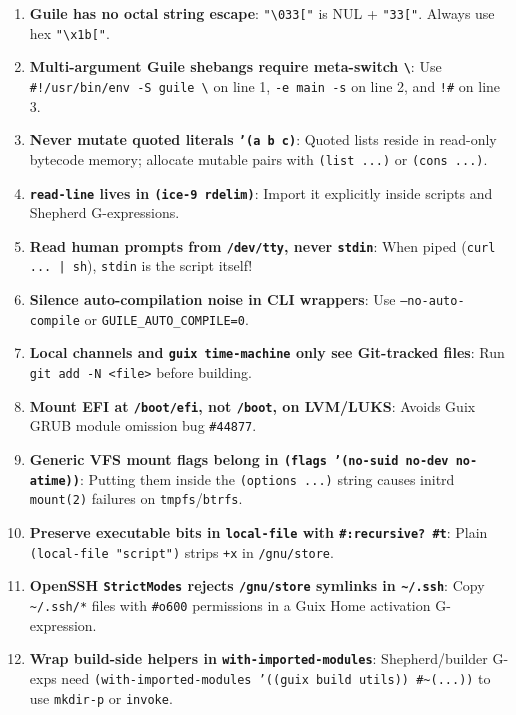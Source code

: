 \documentclass[11pt,oneside]{book}
\begin{document}
\begin{enumerate}[leftmargin=1.8em,itemsep=2pt]
  \item \textbf{Guile has no octal string escape}: \texttt{"\textbackslash 033["} is NUL + \texttt{"33["}. Always use hex \texttt{"\textbackslash x1b["}.
  \item \textbf{Multi-argument Guile shebangs require meta-switch \texttt{\textbackslash}}: Use \texttt{\#!/usr/bin/env -S guile \textbackslash} on line 1, \texttt{-e main -s} on line 2, and \texttt{!\#} on line 3.
  \item \textbf{Never mutate quoted literals \texttt{'(a b c)}}: Quoted lists reside in read-only bytecode memory; allocate mutable pairs with \texttt{(list ...)} or \texttt{(cons ...)}.
  \item \textbf{\texttt{read-line} lives in \texttt{(ice-9 rdelim)}}: Import it explicitly inside scripts and Shepherd G-expressions.
  \item \textbf{Read human prompts from \texttt{/dev/tty}, never \texttt{stdin}}: When piped (\texttt{curl ... | sh}), \texttt{stdin} is the script itself!
  \item \textbf{Silence auto-compilation noise in CLI wrappers}: Use \texttt{--no-auto-compile} or \texttt{GUILE\_AUTO\_COMPILE=0}.
  \item \textbf{Local channels and \texttt{guix time-machine} only see Git-tracked files}: Run \texttt{git add -N <file>} before building.
  \item \textbf{Mount EFI at \texttt{/boot/efi}, not \texttt{/boot}, on LVM/LUKS}: Avoids Guix GRUB module omission bug \texttt{\#44877}.
  \item \textbf{Generic VFS mount flags belong in \texttt{(flags '(no-suid no-dev no-atime))}}: Putting them inside the \texttt{(options ...)} string causes initrd \texttt{mount(2)} failures on \texttt{tmpfs}/\texttt{btrfs}.
  \item \textbf{Preserve executable bits in \texttt{local-file} with \texttt{\#:recursive? \#t}}: Plain \texttt{(local-file "script")} strips \texttt{+x} in \texttt{/gnu/store}.
  \item \textbf{OpenSSH \texttt{StrictModes} rejects \texttt{/gnu/store} symlinks in \texttt{\textasciitilde/.ssh}}: Copy \texttt{\textasciitilde/.ssh/*} files with \texttt{\#o600} permissions in a Guix Home activation G-expression.
  \item \textbf{Wrap build-side helpers in \texttt{with-imported-modules}}: Shepherd/builder G-exps need \texttt{(with-imported-modules '((guix build utils)) \#\textasciitilde(...))} to use \texttt{mkdir-p} or \texttt{invoke}.

\end{enumerate}
\end{document}
